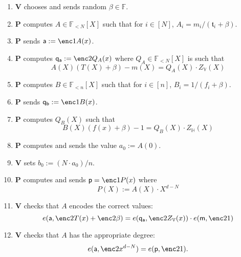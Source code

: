 \documentclass[11pt]{article} %
\newcommand{\F}{\ensuremath{\mathbb F}\xspace}
\newcommand{\defeq}{:=}
\newcommand{\prv}{\ensuremath{\mathsf{\mathbf{P}}}\xspace}
\newcommand{\ver}{\ensuremath{\mathsf{\mathbf{V}}}\xspace}
\newcommand{\polysofdeg}[1]{\ensuremath{\F_{< #1}[X]}\xspace}
\newcommand{\subspace}{\ensuremath{\mathbb{H}}\xspace}
\newcommand{\bigspace}{\ensuremath{\mathbb{V}}\xspace}
\newcommand{\witsize}{\ensuremath{n}\xspace}
\newcommand{\tabsize}{\ensuremath{N}\xspace}
\newcommand{\tab}{\ensuremath{\mathfrak{t}}\xspace}
\renewcommand{\a}{\ensuremath{\mathsf{a}}\xspace}
\renewcommand{\p}{\ensuremath{\mathsf{p}}\xspace}
\newcommand{\qa}{\ensuremath{\mathsf{q_a}}\xspace}
\newcommand{\qb}{\ensuremath{\mathsf{q_b}}\xspace}
\newcommand{\m}{\ensuremath{\mathsf{m}}\xspace}
\begin{document}
\begin{enumerate}
 \item \ver chooses and sends random $\beta \in \F$.
\item \prv computes $A\in \polysofdeg{\tabsize}$ such that for $i\in [\tabsize]$, $A_i = m_i/(\tab_i+\beta)$.
\item \prv sends $\a\defeq \enc1{A(x)}$.
\item\label{step:computeQA} \prv computes $\qa \defeq \enc2{Q_A(x)}$ where $Q_A\in \polysofdeg{\tabsize}$ is such that 
\[A(X)(T(X)+\beta)-m(X)= Q_A(X)\cdot Z_\bigspace(X)\]
\item \prv computes $B\in \polysofdeg{\witsize}$ such that for $i\in [\witsize]$, $B_i=1/(f_i+\beta)$.
\item \prv sends $\qb\defeq \enc1{B(x)}$.
\item \prv computes $Q_B(X)$ such that 
\[B(X)(f(x)+\beta)-1 = Q_B(X)\cdot Z_\subspace(X)\]
\item \prv computes and sends the value $a_0\defeq A(0)$.
\item \ver  sets $b_0\defeq (\tabsize\cdot a_0)/\witsize$.
\item \prv computes and sends $\p=\enc1{P(x)}$ where
\[P(X)\defeq A(X)\cdot X^{d-\tabsize} \]
\item\label{step:checkqa} \ver checks that $A$ encodes the correct values:
\[e(\a,\enc2{T(x)}+\enc2{\beta} )=e(\qa,\enc2{Z_\bigspace(x)})\cdot e(\m,\enc2{1})\]
\item\label{step:checkadeg} \ver checks that $A$ has the appropriate degree:
\[e(\a,\enc2{x^{d-\tabsize}})=e(\p,\enc2{1}).\]
 \end{enumerate}
\end{document}

